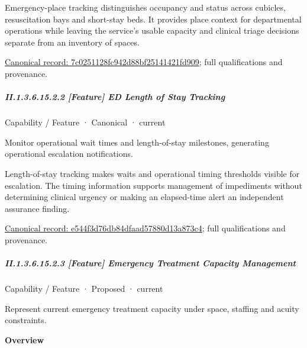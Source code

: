 Emergency-place tracking distinguishes occupancy and status across cubicles, resuscitation bays and short-stay beds. It provides place context for departmental operations while leaving the service's usable capacity and clinical triage decisions separate from an inventory of spaces.


{\footnotesize \href{../../../../continuum/strategy/capability/feature/7c0251128fc942d88bf25141421fd909.md}{Canonical record: 7c0251128fc942d88bf25141421fd909}; full qualifications and provenance.}\par
\subparagraph*{II.1.3.6.15.2.2 [Feature] ED Length of Stay Tracking}
\label{navigation:II.1.3.6.15.2.2}

\label{element:e544f3d76db84dfaad57880d13a873c4}
{\small Capability / Feature · Canonical · current}\par

Monitor operational wait times and length-of-stay milestones, generating operational escalation notifications.



Length-of-stay tracking makes waits and operational timing thresholds visible for escalation. The timing information supports management of impediments without determining clinical urgency or making an elapsed-time alert an independent assurance finding.


{\footnotesize \href{../../../../continuum/strategy/capability/feature/e544f3d76db84dfaad57880d13a873c4.md}{Canonical record: e544f3d76db84dfaad57880d13a873c4}; full qualifications and provenance.}\par
\subparagraph*{II.1.3.6.15.2.3 [Feature] Emergency Treatment Capacity Management}
\label{navigation:II.1.3.6.15.2.3}

\label{element:502876430cf747f4b3bb102fb69557a5}
{\small Capability / Feature · Proposed · current}\par

Represent current emergency treatment capacity under space, staffing and acuity constraints.



\textbf{Overview}



